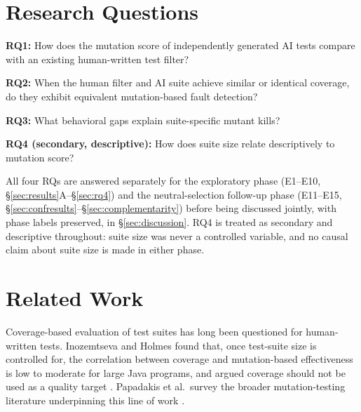 \documentclass[10pt,conference]{IEEEtran}
\begin{document}
\section{Research Questions}
\textbf{RQ1:} How does the mutation score of independently generated AI tests compare with an existing human-written test filter?

\textbf{RQ2:} When the human filter and AI suite achieve similar or identical coverage, do they exhibit equivalent mutation-based fault detection?

\textbf{RQ3:} What behavioral gaps explain suite-specific mutant kills?

\textbf{RQ4 (secondary, descriptive):} How does suite size relate descriptively to mutation score?

All four RQs are answered separately for the exploratory phase (E1--E10, \S\ref{sec:results}A--\S\ref{sec:rq4}) and the neutral-selection follow-up phase (E11--E15, \S\ref{sec:confresults}--\S\ref{sec:complementarity}) before being discussed jointly, with phase labels preserved, in \S\ref{sec:discussion}. RQ4 is treated as secondary and descriptive throughout: suite size was never a controlled variable, and no causal claim about suite size is made in either phase.

\section{Related Work}
\label{sec:relatedwork}
Coverage-based evaluation of test suites has long been questioned for human-written tests. Inozemtseva and Holmes found that, once test-suite size is controlled for, the correlation between coverage and mutation-based effectiveness is low to moderate for large Java programs, and argued coverage should not be used as a quality target \cite{inozemtseva2014}. Papadakis et al.\ survey the broader mutation-testing literature underpinning this line of work \cite{papadakis2019survey}.
\end{document}
